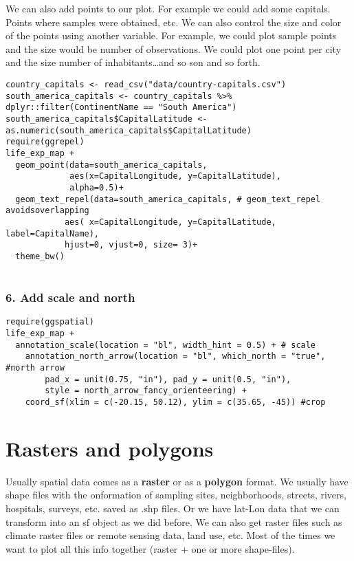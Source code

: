 \documentclass[
]{book}
\theoremstyle{definition}
\theoremstyle{definition}
\theoremstyle{definition}
\theoremstyle{definition}
\theoremstyle{remark}
\begin{document}
We can also add points to our plot. For example we could add some capitals. Points where samples were obtained, etc. We can also control the size and color of the points using another variable. For example, we could plot sample points and the size would be number of observations. We could plot one point per city and the size number of inhabitants\ldots and so son and so forth.

\begin{verbatim}
country_capitals <- read_csv("data/country-capitals.csv")
south_america_capitals <- country_capitals %>% dplyr::filter(ContinentName == "South America")
south_america_capitals$CapitalLatitude <- as.numeric(south_america_capitals$CapitalLatitude)
require(ggrepel)
life_exp_map +
  geom_point(data=south_america_capitals, 
             aes(x=CapitalLongitude, y=CapitalLatitude),
             alpha=0.5)+
  geom_text_repel(data=south_america_capitals, # geom_text_repel avoidsoverlapping
            aes( x=CapitalLongitude, y=CapitalLatitude, label=CapitalName), 
            hjust=0, vjust=0, size= 3)+ 
  theme_bw()
  
\end{verbatim}

\hypertarget{add-scale-and-north}{%
\subsubsection{6. Add scale and north}\label{add-scale-and-north}}

\begin{verbatim}
require(ggspatial)
life_exp_map + 
  annotation_scale(location = "bl", width_hint = 0.5) + # scale
    annotation_north_arrow(location = "bl", which_north = "true", #north arrow
        pad_x = unit(0.75, "in"), pad_y = unit(0.5, "in"),
        style = north_arrow_fancy_orienteering) +
    coord_sf(xlim = c(-20.15, 50.12), ylim = c(35.65, -45)) #crop
\end{verbatim}

\hypertarget{rasters-and-polygons}{%
\section{Rasters and polygons}\label{rasters-and-polygons}}

Usually spatial data comes as a \textbf{raster} or as a \textbf{polygon} format. We usually have shape files with the onformation of sampling sites, neighborhoods, streets, rivers, hospitals, surveys, etc. saved as .shp files.
Or we have lat-Lon data that we can transform into an sf object as we did before.
We can also get raster files such as climate raster files or remote sensing data, land use, etc. Most of the times we want to plot all this info together (raster + one or more shape-files).
\end{document}
